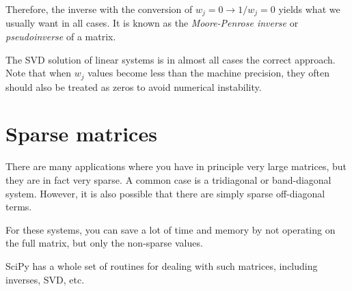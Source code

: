 Therefore, the inverse with the conversion of $w_j = 0\rightarrow
1/w_j = 0$ yields what we usually want in all cases. It is known as
the {\it Moore-Penrose inverse} or {\it pseudoinverse} of a matrix. 

The SVD solution of linear systems is in almost all cases the correct
approach. Note that when $w_j$ values become less than the machine
precision, they often should also be treated as zeros to avoid
numerical instability.

\section{Sparse matrices}

There are many applications where you have in principle very large
matrices, but they are in fact very sparse. A common case is a
tridiagonal or band-diagonal system. However, it is also possible that
there are simply sparse off-diagonal terms. 

For these systems, you can save a lot of time and memory by not
operating on the full matrix, but only the non-sparse values.

SciPy has a whole set of routines for dealing with such matrices,
including inverses, SVD, etc. 

